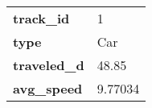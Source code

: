 \begin{tabular}{ll}
\toprule
\textbf{track\_id  } &        1 \\
\textbf{type      } &      Car \\
\textbf{traveled\_d} &    48.85 \\
\textbf{avg\_speed } &  9.77034 \\
\bottomrule
\end{tabular}
